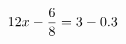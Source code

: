 \documentclass[preview]{standalone}
\begin{document}
\begin{align*}
\special{dvisvgm:raw <g id='unique000'>}12x - \frac{6}{8} = 3 - 0.3\special{dvisvgm:raw </g>}
\end{align*}
\end{document}
